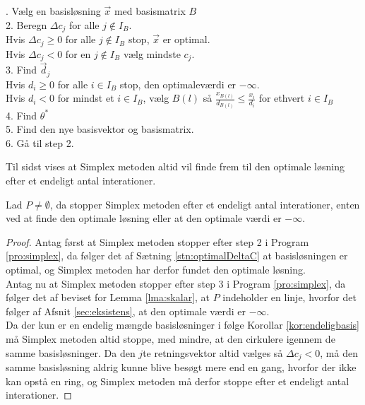\begin{pro}
. Vælg en basisløsning $\vec{x}$ med basismatrix $B$
\\ 2. Beregn $\Delta c_j$ for alle $j \notin I_B$. 
\\  		\qquad Hvis $\Delta c_j\geq 0$ for alle $j \notin I_B$ stop, $\vec{x}$ er optimal.
\\		\qquad  Hvis $\Delta c_j < 0$ for en $j \notin I_B$ vælg mindste $c_j$.
\\ 3. Find $\vec{d}_j$
\\		\qquad  Hvis $d_i \geq 0 $ for alle $i \in I_B$ stop, den optimaleværdi er $- \infty$.
\\		\qquad  Hvis $d_i < 0 $ for mindst et $i \in I_B$, vælg $B(l)$ så $\frac{x_{B(l)}}{d_{B(l)}}\leq \frac{x_i}{d_i} $ for ethvert $i \in I_B$
\\ 4. Find $\theta^*$
\\ 5. Find den nye basisvektor og basismatrix.
\\ 6. Gå til step 2.
\label{pro:simplex}
\end{pro}
Til sidst vises at Simplex metoden altid vil finde frem til den optimale løsning efter et endeligt antal interationer.
\begin{stn}
Lad $P \neq \emptyset$, da stopper Simplex metoden efter et endeligt antal interationer, enten ved at finde den optimale løsning eller at den optimale værdi er $- \infty$.
\end{stn}
\begin{proof}
Antag først at Simplex metoden stopper efter step 2 i Program \ref{pro:simplex}, da følger det af Sætning \ref{stn:optimalDeltaC}
at basisløsningen er optimal, og Simplex metoden har derfor fundet den optimale løsning.
\\ Antag nu at Simplex metoden stopper efter step 3 i Program \ref{pro:simplex}, da følger det af beviset for Lemma \ref{lma:skalar}, at $P$ indeholder en linje, hvorfor det følger af Afsnit \ref{sec:eksistens},
at den optimale værdi er $-\infty$.
\\ Da der kun er en endelig mængde basisløsninger i følge Korollar \ref{kor:endeligbasis}
må Simplex metoden altid stoppe, med mindre, at den cirkulere igennem de samme basisløsninger.
Da den $j$te retningsvektor altid vælges så $\Delta c_j < 0$, må den samme basisløsning aldrig kunne blive besøgt mere end en gang, hvorfor der ikke kan opstå en ring, og Simplex metoden må derfor stoppe efter et endeligt antal interationer.
\end{proof} 




